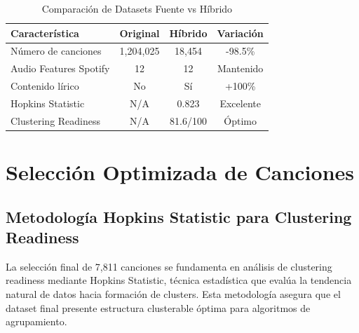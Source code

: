 \documentclass[12pt,a4paper]{report}
\begin{document}
\begin{table}[H]
\centering
\caption{Comparación de Datasets Fuente vs Híbrido}
\begin{tabular}{|l|c|c|c|}
\hline
\textbf{Característica} & \textbf{Original} & \textbf{Híbrido} & \textbf{Variación} \\
\hline
Número de canciones & 1,204,025 & 18,454 & -98.5\% \\
\hline
Audio Features Spotify & 12 & 12 & Mantenido \\
\hline
Contenido lírico & No & Sí & +100\% \\
\hline
Hopkins Statistic & N/A & 0.823 & Excelente \\
\hline
Clustering Readiness & N/A & 81.6/100 & Óptimo \\
\hline
\end{tabular}
\end{table}

\section{Selección Optimizada de Canciones}

\subsection{Metodología Hopkins Statistic para Clustering Readiness}

La selección final de 7,811 canciones se fundamenta en análisis de clustering readiness mediante Hopkins Statistic, técnica estadística que evalúa la tendencia natural de datos hacia formación de clusters. Esta metodología asegura que el dataset final presente estructura clusterable óptima para algoritmos de agrupamiento.
\end{document}
